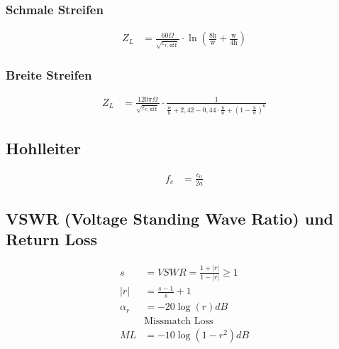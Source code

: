 \subsubsection{Schmale Streifen}
\begin{align*}
    Z_L & = \frac{60\Omega}{\sqrt{\varepsilon_{r,\texttt{eff}}}}\cdot\ln\left(\frac{8\text{h}}{\text{w}}+\frac{\mathrm{w}}{4\mathrm{h}}\right)
\end{align*}
\subsubsection{Breite Streifen}
\begin{align*}
    Z_L & = \frac{120\pi\Omega}{\sqrt{\varepsilon_{r,\texttt{eff}}}}\cdot\frac{1}{\frac{\text{w}}{\text{h}}+2,42-0,44\cdot\frac{\mathrm{h}}{\mathrm{w}}+\left(1-\frac{\mathrm{h}}{\mathrm{w}}\right)^6}
\end{align*}

\subsection{Hohlleiter}
\begin{align*}
    f_c & = \frac{c_0}{2a}
\end{align*}

\subsection{VSWR (Voltage Standing Wave Ratio) und Return Loss}
\begin{align*}
    s        & = VSWR = \frac{1+|r|}{1-|r|}\geq 1 \\
    |r|      & = \frac{s-1}s+{1}                  \\
    \alpha_r & = -20\log(r)dB                     \\
             & \text{Missmatch Loss}              \\
    ML       & = -10\log(1-r^2)dB
\end{align*}

